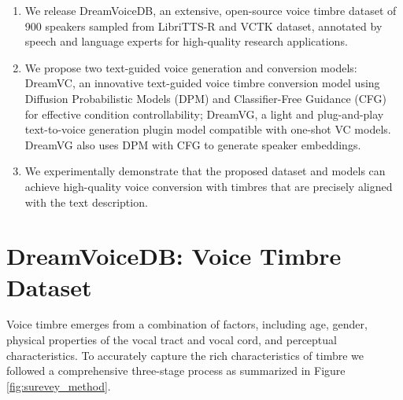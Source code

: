 \documentclass{Interspeech2024}
\begin{document}
\begin{enumerate}
    \item We release DreamVoiceDB, an extensive, open-source voice timbre dataset of 900 speakers sampled from LibriTTS-R \cite{koizumi2023libritts} and VCTK \cite{Yamagishi2019VCTK} dataset, annotated by speech and language experts for high-quality research applications. 
    \item We propose two text-guided voice generation and conversion models: DreamVC, an innovative text-guided voice timbre conversion model using Diffusion Probabilistic Models (DPM) \cite{ho2020denoising} and Classifier-Free Guidance (CFG) \cite{ho2022classifier} for effective condition controllability; DreamVG, a light and plug-and-play text-to-voice generation plugin model compatible with one-shot VC models. DreamVG also uses DPM with CFG to generate speaker embeddings.
    \item We experimentally demonstrate that the proposed dataset and models can achieve high-quality voice conversion with timbres that are precisely aligned with the text description.
\end{enumerate}







\section{DreamVoiceDB: Voice Timbre Dataset}
\label{sec:dreamvoicedb}

Voice timbre emerges from a combination of factors, including age, gender, physical properties of the vocal tract and vocal cord, and perceptual characteristics.
To accurately capture the rich characteristics of timbre we followed a comprehensive three-stage process as summarized in Figure \ref{fig:surevey_method}.           
\end{document}
